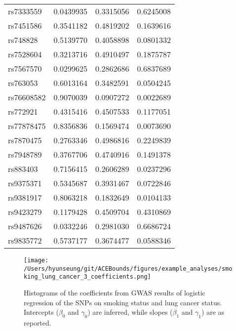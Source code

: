 \documentclass[
]{article}
\theoremstyle{plain}
\begin{document}
{\begin{table}[H]
\begin{minipage}{0.5\linewidth}
\begin{table}[H]
\begin{tabular}{lrrr}
\addlinespace
rs7333559 & 0.0439935 & 0.3315056 & 0.6245008\\
rs7451586 & 0.3541182 & 0.4819202 & 0.1639616\\
rs748828 & 0.5139770 & 0.4058898 & 0.0801332\\
rs7528604 & 0.3213716 & 0.4910497 & 0.1875787\\
rs7567570 & 0.0299625 & 0.2862686 & 0.6837689\\
\addlinespace
rs763053 & 0.6013164 & 0.3482591 & 0.0504245\\
rs76608582 & 0.9070039 & 0.0907272 & 0.0022689\\
rs772921 & 0.4315416 & 0.4507533 & 0.1177051\\
rs77878475 & 0.8356836 & 0.1569474 & 0.0073690\\
rs7870475 & 0.2763346 & 0.4986816 & 0.2249839\\
\addlinespace
rs7948789 & 0.3767706 & 0.4740916 & 0.1491378\\
rs883403 & 0.7156415 & 0.2606289 & 0.0237296\\
rs9375371 & 0.5345687 & 0.3931467 & 0.0722846\\
rs9381917 & 0.8063218 & 0.1832649 & 0.0104133\\
rs9423279 & 0.1179428 & 0.4509704 & 0.4310869\\
\addlinespace
rs9487626 & 0.0332246 & 0.2981030 & 0.6686724\\
rs9835772 & 0.5737177 & 0.3674477 & 0.0588346\\
\bottomrule
\end{tabular}
\end{table}


  \end{minipage}
\end{table}

\begin{figure}[H]
  \center
  \texttt{[image: /Users/hyunseung/git/ACEBounds/figures/example\_analyses/smoking\_lung\_cancer\_3\_coefficients.png]}
  \caption{Histograms of the coefficients from GWAS results of logistic regression of the SNPs on smoking status and lung cancer status. Intercepts ($\beta_0$ and $\gamma_0$) are inferred, while slopes ($\beta_1$ and $\gamma_1$) are as reported.}
  \label{fig:marginal-distribution-of-coefficients-lung-cancer}
\end{figure}

}
\end{document}
